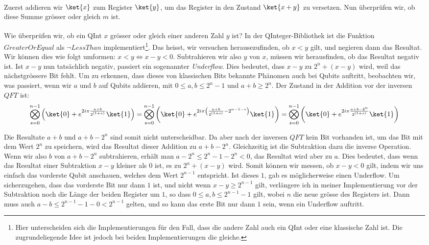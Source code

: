 \paragraph{}

Zuerst addieren wir $\ket{x}$ zum Register $\ket{y}$, um das Register in den Zustand $\ket{x + y}$ zu versetzen. Nun überprüfen wir, ob diese Summe grösser oder gleich $m$ ist. 

\paragraph{}

Wie überprüfen wir, ob ein QInt $x$ grösser oder gleich einer anderen Zahl $y$ ist? In der QInteger-Bibliothek ist die Funktion $GreaterOrEqual$ als $\neg LessThan$ implementiert\footnote{Hier unterscheiden sich die Implementierungen für den Fall, dass die andere Zahl auch ein QInt oder eine klassische Zahl ist. Die zugrundeliegende Idee ist jedoch bei beiden Implementierungen die gleiche.}. Das heisst, wir versuchen herausezufinden, ob $x < y$ gilt, und negieren dann das Resultat. Wir können dies wie folgt umformen: $x < y \Leftrightarrow x - y < 0$. Subtrahieren wir also $y$ von $x$, müssen wir herausfinden, ob das Resultat negativ ist. Ist $x - y$ nun tatsächlich negativ, passiert ein sogenannter \textit{Underflow}. Dies bedeutet, dass $x - y$ zu $2^n + (x - y)$ wird, weil das nächstgrössere Bit fehlt. Um zu erkennen, dass dieses von klassischen Bits bekannte Phänomen auch bei Qubits auftritt, beobachten wir, was passiert, wenn wir $a$ und $b$ auf Qubits addieren, mit $0 \leq a, b \leq 2^n - 1$ und $a + b \geq 2^n$. Der Zustand in der Addition vor der inversen $QFT$ ist: $$\bigotimes_{s = 0}^{n - 1}{\left( \ket{0} + e^{2i\pi\frac{a + b}{2^{(1 + s)}}}\ket{1} \right)} = \bigotimes_{s = 0}^{n - 1}{\left(\ket{0} + e^{2i\pi\left(\frac{a + b}{2^{(1 + s)}} - 2^{n - 1 - s}\right)}\ket{1} \right)} = \bigotimes_{s = 0}^{n - 1}{\left( \ket{0} + e^{2i\pi\frac{a + b - 2^n}{2^{(1 + s)}}}\ket{1} \right)}$$

Die Resultate $a + b$ und $a + b - 2^n$ sind somit nicht unterscheidbar. Da aber nach der inversen $QFT$ kein Bit vorhanden ist, um das Bit mit dem Wert $2^n$ zu speichern, wird das Resultat dieser Addition zu $a + b - 2^n$. Gleichzeitig ist die Subtraktion dazu die inverse Operation. Wenn wir also $b$ von $a + b - 2^n$ subtrahieren, erhält man $a - 2^n \leq 2^n - 1 - 2^n < 0$, das Resultat wird aber zu $a$. Dies bedeutet, dass wenn das Resultat einer Subtraktion $x - y$ kleiner als $0$ ist, es zu $2^n + (x - y)$ wird. Somit können wir messen, ob $x - y < 0$ gilt, indem wir uns einfach das vorderste Qubit anschauen, welches dem Wert $2^{n - 1}$ entspricht. Ist dieses $1$, gab es möglicherweise einen Underflow. Um sicherzugehen, dass das vorderste Bit nur dann $1$ ist, und nicht wenn $x - y \geq 2^{n - 1}$ gilt, verlängere ich in meiner Implementierung vor der Subtraktion noch die Länge der beiden Register um $1$, so dass $0 \leq a, b \leq 2^{n - 1} - 1$ gilt, wobei $n$ die neue grösse des Registers ist. Dann muss auch $a - b \leq 2^{n - 1} - 1 - 0 < 2^{n - 1}$ gelten, und so kann das erste Bit nur dann $1$ sein, wenn ein Underflow auftritt.

